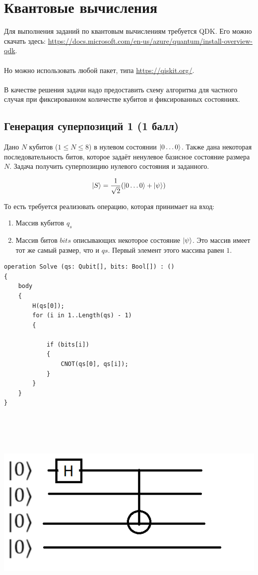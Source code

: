 \documentclass{article}
\begin{document}
\section{Квантовые вычисления}

Для выполнения заданий по квантовым вычислениям требуется QDK. Его можно скачать здесь: \url{https://docs.microsoft.com/en-us/azure/quantum/install-overview-qdk}. 
\\\\
Но можно использовать любой пакет, типа \url{https://qiskit.org/}. 
\\\\
В качестве решения задачи надо предоставить схему алгоритма для частного случая при фиксированном количестве кубитов и фиксированных состояниях. 


\subsection{Генерация суперпозиций 1 (1 балл)}

Дано $N$ кубитов ($1 \le N \le 8$) в нулевом состоянии $\Ket{0\dots0}$. Также дана некоторая последовательность битов, которое задаёт ненулевое базисное состояние размера $N$. Задача получить суперпозицию нулевого состояния и заданного.

$$\Ket{S} = \frac{1}{\sqrt2}(\Ket{0\dots0} +\Ket{\psi})$$

То есть требуется реализовать операцию, которая принимает на вход:

\begin{enumerate}
    \item Массив кубитов $q_s$
    \item Массив битов $bits$ описывающих некоторое состояние $\Ket{\psi}$. Это массив имеет тот же самый размер, что и $qs$. Первый элемент этого массива равен $1$.
\end{enumerate}


\begin{lstlisting}
operation Solve (qs: Qubit[], bits: Bool[]) : () 
{
    body 
    {
        H(qs[0]);  
        for (i in 1..Length(qs) - 1)
        {

            if (bits[i]) 
            {
                CNOT(qs[0], qs[i]);
            }
        }
    }
}




\end{lstlisting}
\\
\includegraphics [scale=0.5]{3_1.png}\\\\\
\end{document}
